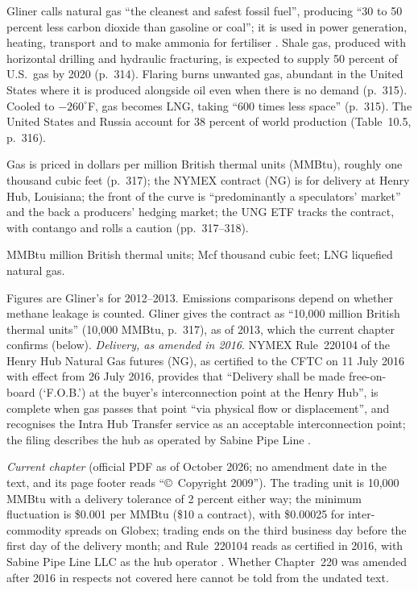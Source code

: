 \begin{qfdefinition}\label{def:natural-gas-market}
 Gliner calls natural gas ``the cleanest and safest fossil fuel'', producing ``30 to 50 percent less carbon dioxide than gasoline or coal''; it is used in power generation, heating, transport and to make ammonia for fertiliser \citep[chap.~10, sec.\ ``Natural Gas'', PDF pp.~313--316]{s7-gliner}. Shale gas, produced with horizontal drilling and hydraulic fracturing, is expected to supply 50 percent of U.S.\ gas by 2020 (p.~314). Flaring burns unwanted gas, abundant in the United States where it is produced alongside oil even when there is no demand (p.~315). Cooled to $-260^\circ$F, gas becomes LNG, taking ``600 times less space'' (p.~315). The United States and Russia account for 38 percent of world production (Table~10.5, p.~316).

Gas is priced in dollars per million British thermal units (MMBtu), roughly one thousand cubic feet (p.~317); the NYMEX contract (NG) is for delivery at Henry Hub, Louisiana; the front of the curve is ``predominantly a speculators' market'' and the back a producers' hedging market; the UNG ETF tracks the contract, with contango and rolls a caution (pp.~317--318).

 MMBtu million British thermal units; Mcf thousand cubic feet; LNG liquefied natural gas.

 Figures are Gliner's for 2012--2013. Emissions comparisons depend on whether methane leakage is counted. Gliner gives the contract as ``10,000 million British thermal units'' (10,000 MMBtu, p.~317), as of 2013, which the current chapter confirms (below). \emph{Delivery, as amended in 2016}. NYMEX Rule~220104 of the Henry Hub Natural Gas futures (NG), as certified to the CFTC on 11 July 2016 with effect from 26 July 2016, provides that ``Delivery shall be made free-on-board (`F.O.B.') at the buyer's interconnection point at the Henry Hub'', is complete when gas passes that point ``via physical flow or displacement'', and recognises the Intra Hub Transfer service as an acceptable interconnection point; the filing describes the hub as operated by Sabine Pipe Line \citep[Submission 16-080, pp.~1--3 and Appendix~A]{nymex-16-080}.

\emph{Current chapter} (official PDF as of October 2026; no amendment date in the text, and its page footer reads ``\copyright\ Copyright 2009''). The trading unit is 10{,}000 MMBtu with a delivery tolerance of 2 percent either way; the minimum fluctuation is \$0.001 per MMBtu (\$10 a contract), with \$0.00025 for inter-commodity spreads on Globex; trading ends on the third business day before the first day of the delivery month; and Rule~220104 reads as certified in 2016, with Sabine Pipe Line LLC as the hub operator \citep[Rules 220101--220104]{nymex-ch220-2026}. Whether Chapter~220 was amended after 2016 in respects not covered here cannot be told from the undated text.


\end{qfdefinition}
